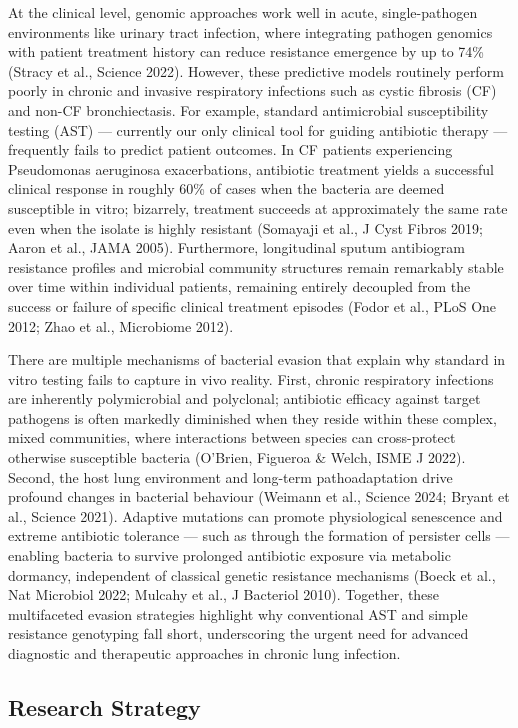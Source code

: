 \documentclass{article}
\begin{document}
At the clinical level, genomic approaches work well in acute, single-pathogen environments like urinary tract infection, where integrating pathogen genomics with patient treatment history can reduce resistance emergence by up to 74\% (Stracy et al., Science 2022). However, these predictive models routinely perform poorly in chronic and invasive respiratory infections such as cystic fibrosis (CF) and non-CF bronchiectasis. For example, standard antimicrobial susceptibility testing (AST) — currently our only clinical tool for guiding antibiotic therapy — frequently fails to predict patient outcomes. In CF patients experiencing Pseudomonas aeruginosa exacerbations, antibiotic treatment yields a successful clinical response in roughly 60\% of cases when the bacteria are deemed susceptible in vitro; bizarrely, treatment succeeds at approximately the same rate even when the isolate is highly resistant (Somayaji et al., J Cyst Fibros 2019; Aaron et al., JAMA 2005). Furthermore, longitudinal sputum antibiogram resistance profiles and microbial community structures remain remarkably stable over time within individual patients, remaining entirely decoupled from the success or failure of specific clinical treatment episodes (Fodor et al., PLoS One 2012; Zhao et al., Microbiome 2012).

There are multiple mechanisms of bacterial evasion that explain why standard in vitro testing fails to capture in vivo reality. First, chronic respiratory infections are inherently polymicrobial and polyclonal; antibiotic efficacy against target pathogens is often markedly diminished when they reside within these complex, mixed communities, where interactions between species can cross-protect otherwise susceptible bacteria (O'Brien, Figueroa & Welch, ISME J 2022). Second, the host lung environment and long-term pathoadaptation drive profound changes in bacterial behaviour (Weimann et al., Science 2024; Bryant et al., Science 2021). Adaptive mutations can promote physiological senescence and extreme antibiotic tolerance — such as through the formation of persister cells — enabling bacteria to survive prolonged antibiotic exposure via metabolic dormancy, independent of classical genetic resistance mechanisms (Boeck et al., Nat Microbiol 2022; Mulcahy et al., J Bacteriol 2010). Together, these multifaceted evasion strategies highlight why conventional AST and simple resistance genotyping fall short, underscoring the urgent need for advanced diagnostic and therapeutic approaches in chronic lung infection.


\subsection*{Research Strategy}
\end{document}
